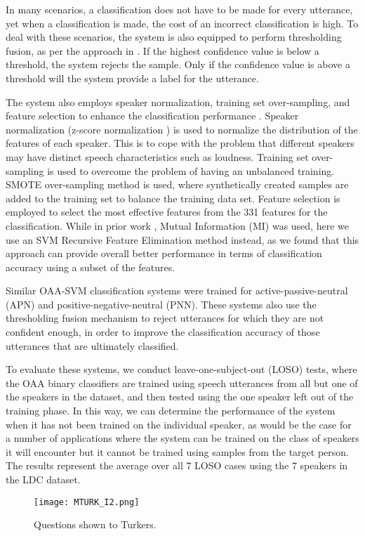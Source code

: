 \documentclass{article}
\begin{document}
In many scenarios, a classification does not have to be made for every utterance, yet when a classification is made, the cost of an incorrect classification is high. To deal with these scenarios, the system is also equipped to perform thresholding fusion, as per the approach in \cite{vapnik1998statistical}. If the highest confidence value is below a threshold, the system rejects the sample. Only if the confidence value is above a threshold will the system provide a label for the utterance. \par
The system also employs speaker normalization, training set over-sampling, and feature selection to enhance the classification performance \cite{yang2012speech}. Speaker normalization (z-score normalization \cite{farrus2007histogram}) is used to normalize the distribution of the features of each speaker. This is to cope with the problem that different speakers may have distinct speech characteristics such as loudness. Training set over-sampling is used to overcome the problem of having an unbalanced training. SMOTE \cite{chawla2002smote} over-sampling method is used, where synthetically created samples are added to the training set to balance the training data set. Feature selection is employed to select the most effective features from the 331 features for the classification. While in prior work \cite{yang2012speech}, Mutual Information (MI) was used, here we use an SVM Recursive Feature Elimination \cite{guyon2002SVMRFE} method instead, as we found that this approach can provide overall better performance in terms of classification accuracy using a subset of the features. \par
Similar OAA-SVM classification systems were trained for active-passive-neutral (APN) and positive-negative-neutral (PNN). These systems also use the thresholding fusion mechanism to reject utterances for which they are not confident enough, in order to improve the classification accuracy of those utterances that are ultimately classified. \par	
To evaluate these systems, we conduct leave-one-subject-out (LOSO) tests, where the OAA binary classifiers are trained using speech utterances from all but one of the speakers in the dataset, and then tested using the one speaker left out of the training phase. In this way, we can determine the performance of the system when it has not been trained on the individual speaker, as would be the case for a number of applications where the system can be trained on the class of speakers it will encounter but it cannot be trained using samples from the target person.  The results represent the average over all 7 LOSO cases using the 7 speakers in the LDC dataset.
\begin{figure}[t!]
	\centering
\texttt{[image: MTURK\_I2.png]}	
	\caption{Questions shown to Turkers.}
	\label{fig:MTurk_Page_2}
\end{figure}
\end{document}

